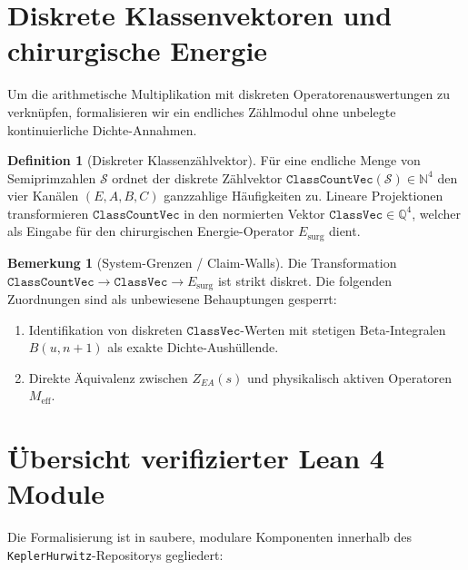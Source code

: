 \documentclass[11pt,a4paper]{article}
\theoremstyle{definition}
\newtheorem{definition}[theorem]{Definition}
\newtheorem{remark}[theorem]{Bemerkung}
\begin{document}
	\section{Diskrete Klassenvektoren und chirurgische Energie}
	
	Um die arithmetische Multiplikation mit diskreten Operatorenauswertungen zu verknüpfen, formalisieren wir ein endliches Zählmodul ohne unbelegte kontinuierliche Dichte-Annahmen.
	
	\begin{definition}[Diskreter Klassenzählvektor]
		Für eine endliche Menge von Semiprimzahlen $\mathcal{S}$ ordnet der diskrete Zählvektor $\mathtt{ClassCountVec}(\mathcal{S}) \in \mathbb{N}^4$ den vier Kanälen $(E, A, B, C)$ ganzzahlige Häufigkeiten zu. Lineare Projektionen transformieren $\mathtt{ClassCountVec}$ in den normierten Vektor $\mathtt{ClassVec} \in \mathbb{Q}^4$, welcher als Eingabe für den chirurgischen Energie-Operator $E_{\mathrm{surg}}$ dient.
	\end{definition}
	
	\begin{remark}[System-Grenzen / Claim-Walls]
		Die Transformation $\mathtt{ClassCountVec} \to \mathtt{ClassVec} \to E_{\mathrm{surg}}$ ist strikt diskret. Die folgenden Zuordnungen sind als unbewiesene Behauptungen gesperrt:
		\begin{enumerate}
			\item Identifikation von diskreten $\mathtt{ClassVec}$-Werten mit stetigen Beta-Integralen $B(u, n+1)$ als exakte Dichte-Aushüllende.
			\item Direkte Äquivalenz zwischen $Z_{EA}(s)$ und physikalisch aktiven Operatoren $M_{\mathrm{eff}}$.
		\end{enumerate}
	\end{remark}
	
	\section{Übersicht verifizierter Lean 4 Module}
	
	Die Formalisierung ist in saubere, modulare Komponenten innerhalb des \texttt{KeplerHurwitz}-Repositorys gegliedert:
	
\end{document}
